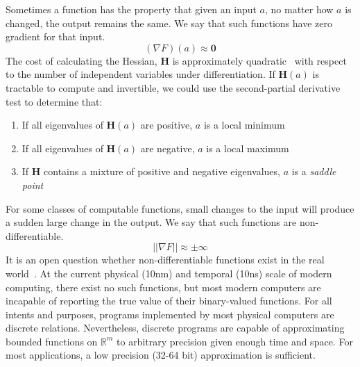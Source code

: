 \documentclass[12pt,initial,twoside,maitrise]{dms}
\numberwithin{equation}{section}
\numberwithin{table}{chapter}
\numberwithin{figure}{chapter}
\begin{document}
\noindent Sometimes a function has the property that given an input $a$, no matter how $a$ is changed, the output remains the same. We say that such functions have zero gradient for that input.
%
\begin{equation}
    (\nabla F)(a) \approx \mathbf{0}
\end{equation}
%
The cost of calculating the Hessian, $\mathbf{H}$ is approximately quadratic~\citep{griewank1993some} with respect to the number of independent variables under differentiation. If $\mathbf{H}(a)$ is tractable to compute and invertible, we could use the second-partial derivative test to determine that:\\
%
\begin{enumerate}
    \item If all eigenvalues of $\mathbf{H}(a)$ are positive, $a$ is a local minimum
    \item If all eigenvalues of $\mathbf{H}(a)$ are negative, $a$ is a local maximum
    \item If $\mathbf{H}$ contains a mixture of positive and negative eigenvalues, $a$ is a \textit{saddle point}\\
\end{enumerate}
%
For some classes of computable functions, small changes to the input will produce a sudden large change in the output. We say that such functions are non-differentiable.
%
\begin{equation}
    ||\nabla F|| \approx \pm \infty
\end{equation}
%
It is an open question whether non-differentiable functions exist in the real world~\citep{buniy2005hilbert}. At the current physical (10nm) and temporal (10ns) scale of modern computing, there exist no such functions, but most modern computers are incapable of reporting the true value of their binary-valued functions. For all intents and purposes, programs implemented by most physical computers are discrete relations. Nevertheless, discrete programs are capable of approximating bounded functions on $\mathbb{R}^m$ to arbitrary precision given enough time and space. For most applications, a low precision (32-64 bit) approximation is sufficient.
\end{document}
